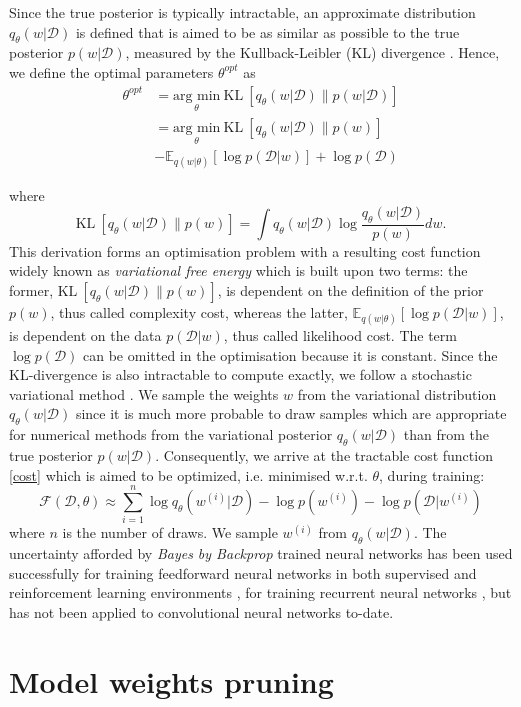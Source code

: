 Since the true posterior is typically intractable, an approximate distribution $q_{\theta}(w|\mathcal{D})$ is defined that is aimed to be as similar as possible to the true posterior $p(w|\mathcal{D})$, measured by the Kullback-Leibler (KL) divergence \cite{kullback1951information}. Hence, we define the optimal parameters $\theta^{opt}$ as
\begin{equation}
    \begin{aligned} \label{KL}
        \theta^{opt}&=\underset{\theta}{\text{arg min}}\ \text{KL} \ [q_{\theta}(w|\mathcal{D})\|p(w|\mathcal{D})] \\
        &=\underset{\theta}{\text{arg min}}\ \text{KL} \ [q_{\theta}(w|\mathcal{D})\|p(w)] \\ & -\mathbb{E}_{q(w|\theta)}[\log p(\mathcal{D}|w)]+\log p(\mathcal{D})
    \end{aligned}
\end{equation}

where
\begin{equation}
    \text{KL} \ [q_{\theta}(w|\mathcal{D})\|p(w)]= \int q_{\theta}(w|\mathcal{D})\log\frac{q_{\theta}(w|\mathcal{D})}{p(w)}dw .
\end{equation}
This derivation forms an optimisation problem with a resulting cost function widely known as \textit{variational free energy} \cite{neal1998view,yedidia2005constructing,friston2007variational} which is built upon two terms: the former, $\text{KL} \ [q_{\theta}(w|\mathcal{D})\|p(w)]$, is dependent on the definition of the prior $p(w)$, thus called complexity cost, whereas the latter, $\mathbb{E}_{q(w|\theta)}[\log p(\mathcal{D}|w)]$, is dependent on the data $p(\mathcal{D}|w)$, thus called likelihood cost. 
The term $\log p(\mathcal{D})$ can be omitted in the optimisation because it is constant.
\newline Since the KL-divergence is also intractable to compute exactly, we follow a stochastic variational method \cite{graves2011practical,blundell2015weight}.
We sample the weights $w$ from the variational distribution $q_{\theta}(w|\mathcal{D})$ since it is much more probable to draw samples which are appropriate for numerical methods from the variational posterior $q_{\theta}(w|\mathcal{D})$ than from the true posterior $p(w|\mathcal{D})$. Consequently, we arrive at the tractable cost function \eqref{cost} which is aimed to be optimized, i.e. minimised w.r.t. $\theta$, during training:
\begin{equation} \label{cost}
    \mathcal{F}(\mathcal{D}, \theta)\approx \sum_{i=1}^n \log q_{\theta}(w^{(i)}|\mathcal{D})-\log p(w^{(i)})-\log p(\mathcal{D}|w^{(i)})
\end{equation}
%
where $n$ is the number of draws.
\newline We sample $w^{(i)}$ from $q_{\theta}(w|\mathcal{D})$. The uncertainty afforded by \textit{Bayes by Backprop} trained neural networks has been used successfully for training feedforward neural networks in both supervised and reinforcement learning environments \cite{blundell2015weight,lipton2016efficient,houthooft2016curiosity}, for training recurrent neural networks \cite{fortunato2017bayesian}, but has not been applied to convolutional neural networks to-date.

\section{Model weights pruning}

